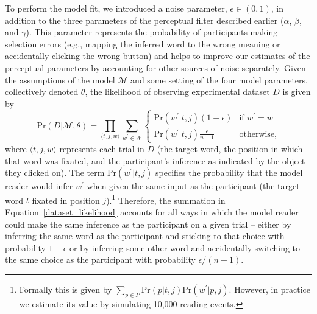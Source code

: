 \documentclass[doc,biblatex,floatsintext]{apa7}
\begin{document}
To perform the model fit, we introduced a noise parameter, $\epsilon \in (0, 1)$, in addition to the three parameters of the perceptual filter described earlier ($\alpha$, $\beta$, and $\gamma$). This parameter represents the probability of participants making selection errors (e.g., mapping the inferred word to the wrong meaning or accidentally clicking the wrong button) and helps to improve our estimates of the perceptual parameters by accounting for other sources of noise separately. Given the assumptions of the model $\mathcal{M}$ and some setting of the four model parameters, collectively denoted $\theta$, the likelihood of observing experimental dataset $D$ is given by
\begin{equation}
\mathrm{Pr}(D|\mathcal{M},\theta) = \prod_{\langle t,j,w \rangle} \sum_{w^\prime \in W}
    \begin{cases}
    \mathrm{Pr}(w^\prime|t,j)(1 - \epsilon)       & \text{if $w^\prime = w$} \\
    \mathrm{Pr}(w^\prime|t,j)\frac{\epsilon}{n-1} & \text{otherwise,}
    \end{cases}
\label{dataset_likelihood}
\end{equation}
where $\langle t,j,w \rangle$ represents each trial in $D$ (the target word, the position in which that word was fixated, and the participant's inference as indicated by the object they clicked on). The term $\mathrm{Pr}(w^\prime|t,j)$ specifies the probability that the model reader would infer $w^\prime$ when given the same input as the participant (the target word $t$ fixated in position $j$).\footnote{Formally this is given by $\sum_{p \in P} \mathrm{Pr}(p|t,j) \mathrm{Pr}(w^\prime|p,j)$. However, in practice we estimate its value by simulating 10,000 reading events.} Therefore, the summation in Equation~\ref{dataset_likelihood} accounts for all ways in which the model reader could make the same inference as the participant on a given trial -- either by inferring the same word as the participant and sticking to that choice with probability $1-\epsilon$ or by inferring some other word and accidentally switching to the same choice as the participant with probability $\epsilon / (n-1)$.
\end{document}
